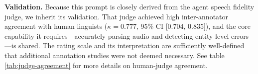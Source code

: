 \textbf{Validation.}
Because this prompt is closely derived from the agent speech fidelity judge, we inherit its validation. That judge achieved high inter-annotator agreement with human linguists ($\kappa =  0.777$, 95\% CI [0.704, 0.835]), and the core capability it requires—accurately parsing audio and detecting entity-level errors—is shared. The rating scale and its interpretation are sufficiently well-defined that additional annotation studies were not deemed necessary. See table \ref{tab:judge-agreement} for more details on human-judge agreement.


